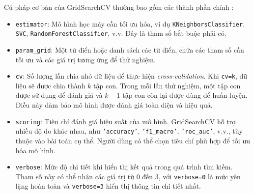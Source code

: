 \documentclass[a4paper,12pt]{article}
\begin{document}
\noindent Cú pháp cơ bản của GridSearchCV thường bao gồm các thành phần chính \cite{gridsearchcv_mygreatlearning}:
\begin{itemize}
    \item \texttt{estimator}: Mô hình học máy cần tối ưu hóa, ví dụ \texttt{KNeighborsClassifier}, \texttt{SVC}, \texttt{RandomForestClassifier}, v.v. Đây là tham số bắt buộc phải có.
    \item \texttt{param\_grid}: Một từ điển hoặc danh sách các từ điển, chứa các tham số cần tối ưu và các giá trị tương ứng để thử nghiệm.
    \item \texttt{cv}: Số lượng lần chia nhỏ dữ liệu để thực hiện \textit{cross-validation}. Khi \texttt{cv=k}, dữ liệu sẽ được chia thành \(k\) tập con. Trong mỗi lần thử nghiệm, một tập con được sử dụng để đánh giá và \(k-1\) tập con còn lại được dùng để huấn luyện. Điều này đảm bảo mô hình được đánh giá toàn diện và hiệu quả.
    \item \texttt{scoring}: Tiêu chí đánh giá hiệu suất của mô hình. GridSearchCV hỗ trợ nhiều độ đo khác nhau, như \texttt{'accuracy'}, \texttt{'f1\_macro'}, \texttt{'roc\_auc'}, v.v., tùy thuộc vào bài toán cụ thể. Người dùng có thể chọn tiêu chí phù hợp để tối ưu hóa mô hình.
    \item \texttt{verbose}: Mức độ chi tiết khi hiển thị kết quả trong quá trình tìm kiếm. Tham số này có thể nhận các giá trị từ 0 đến 3, với \texttt{verbose=0} là mức yên lặng hoàn toàn và \texttt{verbose=3} hiển thị thông tin chi tiết nhất.
\end{itemize}
\end{document}

